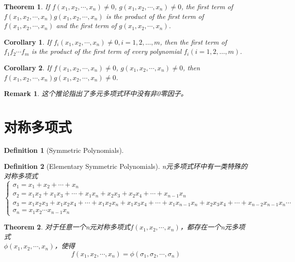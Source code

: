 \documentclass[onecolumn]{ctexart}
\newtheorem{definition}{Definition}
\newtheorem{theorem}{Theorem}
\newtheorem{corollary}{Corollary}
\newtheorem{remark}{Remark}
\begin{document}
\begin{theorem}
  If $f(x_1, x_2, \cdots, x_n) \neq 0$, $g(x_1, x_2, \cdots, x_n) \neq 0$, the 
  first term of \\ $f(x_1, x_2, \cdots, x_n)g(x_1, x_2, \cdots, x_n)$ is the 
  product of the first term of $f(x_1, x_2, \cdots, x_n)$ and the first term of 
  $g(x_1, x_2, \cdots, x_n)$.
\end{theorem}

\begin{corollary}
  If $f_i(x_1, x_2, \cdots, x_n) \neq 0, i = 1, 2, \ldots, m$, then the first 
  term of $f_1f_2 \cdots f_m$ is the product of the first term of every 
  polynomial $f_i (i = 1, 2, \ldots, m)$.
\end{corollary}

\begin{corollary}
  If $f(x_1, x_2, \cdots, x_n) \neq 0$, $g(x_1, x_2, \cdots, x_n) \neq 0$, then $f(x_1, x_2, \cdots, x_n)g(x_1, x_2, \cdots, x_n) \neq 0$.
\end{corollary}
\begin{remark}
  这个推论指出了多元多项式环中没有非0零因子。
\end{remark}

\section{对称多项式}

\begin{definition}[Symmetric Polynomials]
  
\end{definition}

\begin{definition}[Elementary Symmetric Polynomials]
  n元多项式环中有一类特殊的对称多项式
  \begin{equation}
    \begin{cases}
      \sigma_1 = x_1 + x_2 + \cdots + x_n \\
      \sigma_2 = x_1x_2 + x_1x_3 + \cdots + x_1x_n + x_2x_3 + x_2x_4 + \cdots + x_{n-1}x_n \\
      \sigma_3 = x_1x_2x_3 + x_1x_2x_4 + \cdots + x_1x_2x_n + x_1x_3x_4 + \cdots + x_1x_{n-1}x_n + x_2x_3x_4 + \cdots + x_{n-2}x_{n-1}x_n
      \cdots \\
      \sigma_n = x_1x_2 \cdots x_{n-1}x_n
    \end{cases}
  \end{equation}
\end{definition}

\begin{theorem}
  对于任意一个n元对称多项式$f(x_1, x_2, \cdots, x_n)$，都存在一个n元多项式 \\ $\phi(x_1, x_2, \cdots, x_n)$，使得
  \[
    f(x_1, x_2, \cdots, x_n) = \phi(\sigma_1, \sigma_2, \cdots, \sigma_n)
  \]
\end{theorem}
\end{document}

